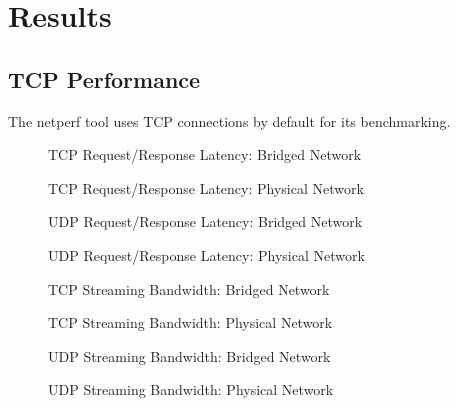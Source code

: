 \chapter{Results}
\label{sec:results}

\section{TCP Performance} %
\label{sec:tcp_performance}
The netperf tool uses TCP connections by default for its benchmarking.  

\begin{figure}
    \centering
    
    \caption{TCP Request/Response Latency: Bridged Network}
    \label{fig:tcp_rr_bridge}
\end{figure}
\begin{figure}
    \centering
    \def\svgwidth{\columnwidth}
    
    \caption{TCP Request/Response Latency: Physical Network}
    \label{fig:tcp_rr_phys}
\end{figure}
\begin{figure}
    \centering
    \def\svgwidth{\columnwidth}
    
    \caption{UDP Request/Response Latency: Bridged Network}
    \label{fig:udp_rr_bridge}
\end{figure}
\begin{figure}
    \centering
    \def\svgwidth{\columnwidth}
    
    \caption{UDP Request/Response Latency: Physical Network}
    \label{fig:udp_rr_phys}
\end{figure}
\begin{figure}
    \centering
    \def\svgwidth{\columnwidth}
    
    \caption{TCP Streaming Bandwidth: Bridged Network}
    \label{fig:tcp_stream_bridge}
\end{figure}
\begin{figure}
    \centering
    \def\svgwidth{\columnwidth}
    
    \caption{TCP Streaming Bandwidth: Physical Network}
    \label{fig:tcp_stream_phys}
\end{figure}
\begin{figure}
    \centering
    \def\svgwidth{\columnwidth}
    
    \caption{UDP Streaming Bandwidth: Bridged Network}
    \label{fig:udp_stream_bridge}
\end{figure}
\begin{figure}
    \centering
    \def\svgwidth{\columnwidth}
    
    \caption{UDP Streaming Bandwidth: Physical Network}
    \label{fig:udp_stream_phys}
\end{figure}
